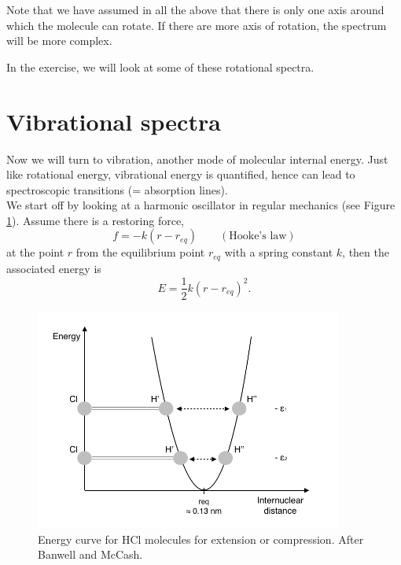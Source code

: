 Note that we have assumed in all the above that there is only one
axis around which the molecule can rotate. If there are more axis of
rotation, the spectrum will be more complex.

In the exercise, we will look at some of these rotational spectra.


\clearpage
\section{Vibrational spectra}
Now we will turn to vibration, another mode of molecular internal energy. Just like rotational energy, vibrational energy is quantified, hence can lead to spectroscopic transitions (= absorption lines). \\
We start off by looking at a harmonic oscillator in regular mechanics (see Figure \ref{Vibration_parabol}). Assume there is a restoring force,
\begin{equation}
f = -k (r-r_{eq}) \qquad (\text{Hooke's law})
\end{equation}
at the point $r$ from the equilibrium point $r_{eq}$ with a spring constant $k$, then the associated energy is
\begin{equation}
E = \frac{1}{2}k (r-r_{eq})^2 .
\end{equation}

\begin{figure}
\begin{center}
\includegraphics[width=0.9\textwidth]{figures/Vibration_parabol}
\caption{Energy curve for HCl molecules for extension or compression. After Banwell and McCash.}
\label{Vibration_parabol}
\end{center}
\end{figure}

